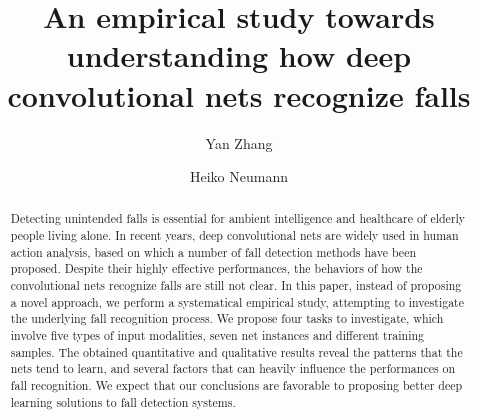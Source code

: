 \documentclass[runningheads]{llncs}
\begin{document}
%
\title{An empirical study towards understanding how deep convolutional nets recognize falls} 

%
\author{Yan Zhang \and
Heiko Neumann}
%
%

%
\maketitle              %
%
\begin{abstract}
Detecting unintended falls is essential for ambient intelligence and healthcare of elderly people living alone. In recent years, deep convolutional nets are widely used in human action analysis, based on which a number of fall detection methods have been proposed. Despite their highly effective performances, the behaviors of how the convolutional nets recognize falls are still not clear. In this paper, instead of proposing a novel approach, we perform a systematical empirical study, attempting to investigate the underlying fall recognition process. We propose four tasks to investigate, which involve five types of input modalities, seven net instances and different training samples. The obtained quantitative and qualitative results reveal the patterns that the nets tend to learn, and several factors that can heavily influence the performances on fall recognition. We expect that our conclusions are favorable to proposing better deep learning solutions to fall detection systems.

\end{abstract}
%
%
\end{document}
